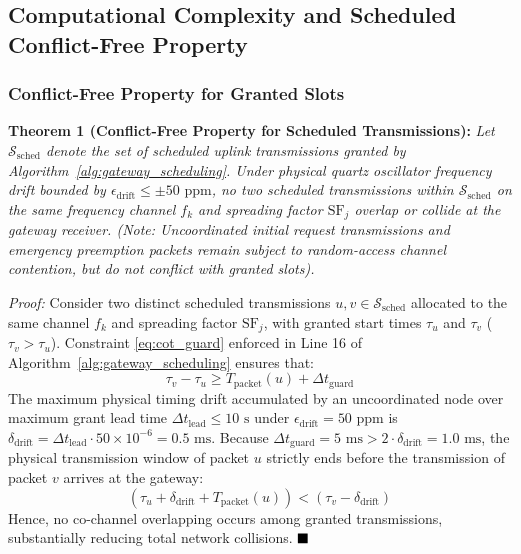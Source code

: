\documentclass[preprint,review,12pt]{elsarticle}
\begin{document}
\subsection{Computational Complexity and Scheduled Conflict-Free Property}

\subsubsection{Conflict-Free Property for Granted Slots}
\textbf{Theorem 1 (Conflict-Free Property for Scheduled Transmissions):} \textit{Let $\mathcal{S}_{\text{sched}}$ denote the set of scheduled uplink transmissions granted by Algorithm~\ref{alg:gateway_scheduling}. Under physical quartz oscillator frequency drift bounded by $\epsilon_{\text{drift}} \le \pm 50\text{ ppm}$, no two scheduled transmissions within $\mathcal{S}_{\text{sched}}$ on the same frequency channel $f_k$ and spreading factor $\text{SF}_j$ overlap or collide at the gateway receiver. (Note: Uncoordinated initial request transmissions and emergency preemption packets remain subject to random-access channel contention, but do not conflict with granted slots).}

\textit{Proof:} Consider two distinct scheduled transmissions $u, v \in \mathcal{S}_{\text{sched}}$ allocated to the same channel $f_k$ and spreading factor $\text{SF}_j$, with granted start times $\tau_u$ and $\tau_v$ ($\tau_v > \tau_u$). Constraint \eqref{eq:cot_guard} enforced in Line 16 of Algorithm~\ref{alg:gateway_scheduling} ensures that:
\begin{equation}
\tau_v - \tau_u \ge T_{\text{packet}}(u) + \Delta t_{\text{guard}}
\end{equation}
The maximum physical timing drift accumulated by an uncoordinated node over maximum grant lead time $\Delta t_{\text{lead}} \le 10\text{ s}$ under $\epsilon_{\text{drift}} = 50\text{ ppm}$ is $\delta_{\text{drift}} = \Delta t_{\text{lead}} \cdot 50 \times 10^{-6} = 0.5\text{ ms}$. Because $\Delta t_{\text{guard}} = 5\text{ ms} > 2 \cdot \delta_{\text{drift}} = 1.0\text{ ms}$, the physical transmission window of packet $u$ strictly ends before the transmission of packet $v$ arrives at the gateway:
\begin{equation}
(\tau_u + \delta_{\text{drift}} + T_{\text{packet}}(u)) < (\tau_v - \delta_{\text{drift}})
\end{equation}
Hence, no co-channel overlapping occurs among granted transmissions, substantially reducing total network collisions. $\hfill \blacksquare$
\end{document}
